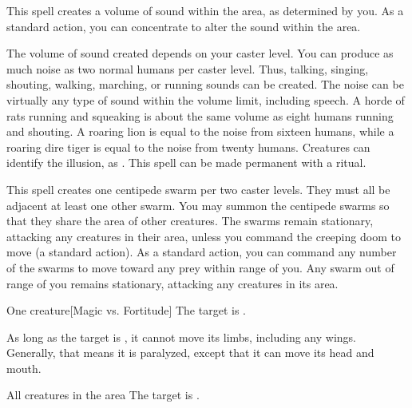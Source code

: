 \spelldur{\durshort \dismissable}
\spellline
\spelleffect This spell creates a volume of sound within the area, as determined by you. As a standard action, you can concentrate to alter the sound within the area.
\par The volume of sound created depends on your caster level. You can produce as much noise as two normal humans per caster level. Thus, talking, singing, shouting, walking, marching, or running sounds can be created. The noise can be virtually any type of sound within the volume limit, including speech. A horde of rats running and squeaking is about the same volume as eight humans running and shouting. A roaring lion is equal to the noise from sixteen humans, while a roaring dire tiger is equal to the noise from twenty humans.
\spellnotes Creatures can identify the illusion, as . This spell can be made permanent with a  ritual.

\spellrng{\rngmed}
\spelldur{\durmed}
\spellline
\spelleffect This spell creates one centipede swarm per two caster levels. They must all be adjacent at least one other swarm. You may summon the centipede swarms so that they share the area of other creatures. The swarms remain stationary, attacking any creatures in their area, unless you command the creeping doom to move (a standard action). As a standard action, you can command any number of the swarms to move toward any prey within range of you. Any swarm out of range of you remains stationary, attacking any creatures in its area.

\spellrng{\rngmed}
\spelldur{\durshort}
\begin{spelltarget}{One creature}[Magic vs. Fortitude]
    \spellsuccess The target is \staggered.

    As long as the target is \bloodied, it cannot move its limbs, including any wings. Generally, that means it is paralyzed, except that it can move its head and mouth.
\end{spelltarget}

\spelldur{\durmed}
\begin{spelltargets}{All creatures in the area}
    The target is \vulnerable.
\end{spelltargets}

